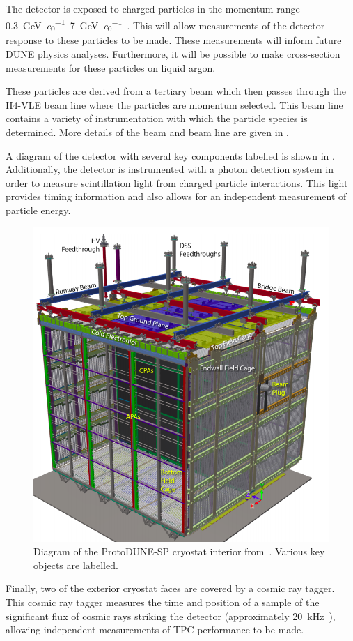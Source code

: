 The detector is exposed to charged particles in the momentum range \SIrange{0.3}{7}{\GeV\per\clight}~\cite{protodunePerformance}.
This will allow measurements of the detector response to these particles to be made.
These measurements will inform future DUNE physics analyses.
Furthermore, it will be possible to make cross-section measurements for these particles on liquid argon.

These particles are derived from a tertiary beam which then passes through the H4-VLE beam line where the particles are momentum selected.
This beam line contains a variety of instrumentation with which the particle species is determined.
More details of the beam and beam line are given in .

A diagram of the detector with several key components labelled is shown in .
Additionally, the detector is instrumented with a photon detection system in order to measure scintillation light from charged particle interactions. 
This light provides timing information and also allows for an independent measurement of particle energy.

\begin{figure}[h]
	\centering
	\includegraphics[width=.6\linewidth]{files/figures/protodune_detector/pdspDiag}
	\caption[Captioned diagram of the ProtoDUNE-SP cryostat interior]{Diagram of the ProtoDUNE-SP cryostat interior from~\cite{protodunePerformance}. Various key objects are labelled.}
	\label{fig:pdspDiag}
\end{figure}

Finally, two of the exterior cryostat faces are covered by a cosmic ray tagger.
This cosmic ray tagger measures the time and position of a sample of the significant flux of cosmic rays striking the detector (approximately \SI{20}{\kilo\hertz}~\cite{protodunePerformance}), allowing independent measurements of TPC performance to be made.

